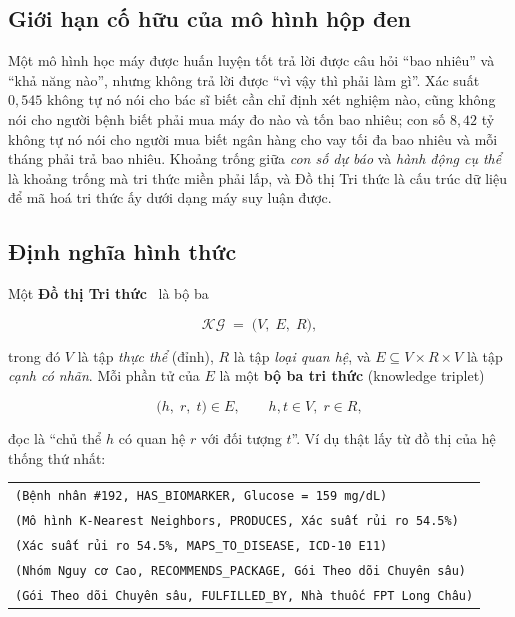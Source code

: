 \subsection{Giới hạn cố hữu của mô hình hộp đen}

Một mô hình học máy được huấn luyện tốt trả lời được câu hỏi ``bao nhiêu'' và
``khả năng nào'', nhưng không trả lời được ``vì vậy thì phải làm gì''. Xác suất
$0{,}545$ không tự nó nói cho bác sĩ biết cần chỉ định xét nghiệm nào, cũng
không nói cho người bệnh biết phải mua máy đo nào và tốn bao nhiêu; con số
$8{,}42$ tỷ không tự nó nói cho người mua biết ngân hàng cho vay tối đa bao
nhiêu và mỗi tháng phải trả bao nhiêu. Khoảng trống giữa \emph{con số dự báo} và
\emph{hành động cụ thể} là khoảng trống mà tri thức miền phải lấp, và Đồ thị Tri
thức là cấu trúc dữ liệu để mã hoá tri thức ấy dưới dạng máy suy luận được.

\subsection{Định nghĩa hình thức}

Một \textbf{Đồ thị Tri thức}~\cite{hogan2021,ji2022} là bộ ba

\begin{equation}
\mathcal{KG} \;=\; \big(V,\; E,\; R\big),
\label{eq:kg}
\end{equation}

\noindent trong đó $V$ là tập \emph{thực thể} (đỉnh), $R$ là tập \emph{loại
quan hệ}, và $E\subseteq V\times R\times V$ là tập \emph{cạnh có nhãn}. Mỗi
phần tử của $E$ là một \textbf{bộ ba tri thức} (knowledge triplet)

\begin{equation}
\big(h,\; r,\; t\big) \in E,
\qquad h,t \in V,\; r \in R,
\label{eq:triplet}
\end{equation}

\noindent đọc là ``chủ thể $h$ có quan hệ $r$ với đối tượng $t$''. Ví dụ thật
lấy từ đồ thị của hệ thống thứ nhất:

\begin{center}
\small
\begin{tabular}{@{}l@{}}
\texttt{(Bệnh nhân \#192, HAS\_BIOMARKER, Glucose = 159 mg/dL)}\\
\texttt{(Mô hình K-Nearest Neighbors, PRODUCES, Xác suất rủi ro 54.5\%)}\\
\texttt{(Xác suất rủi ro 54.5\%, MAPS\_TO\_DISEASE, ICD-10 E11)}\\
\texttt{(Nhóm Nguy cơ Cao, RECOMMENDS\_PACKAGE, Gói Theo dõi Chuyên sâu)}\\
\texttt{(Gói Theo dõi Chuyên sâu, FULFILLED\_BY, Nhà thuốc FPT Long Châu)}\\
\end{tabular}
\end{center}

